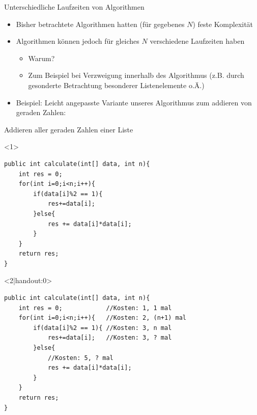 \begin{frame}{Unterschiedliche Laufzeiten von Algorithmen}
    \begin{itemize}[<+->]
        \item Bisher betrachtete Algorithmen hatten (für gegebenes $N$) feste Komplexität
        \item Algorithmen können jedoch für gleiches $N$ verschiedene Laufzeiten haben
        \begin{itemize}
            \item Warum?
            \item<+-|handout:0> Zum Beispiel bei Verzweigung innerhalb des Algorithmus (z.B. durch gesonderte Betrachtung besonderer Listenelemente o.Ä.)
        \end{itemize}
        \item Beispiel: Leicht angepasste Variante unseres Algorithmus zum addieren von geraden Zahlen:
    \end{itemize}
\end{frame}

\begin{frame}[fragile]{Addieren aller geraden Zahlen einer Liste}
\lstset{style=java}
\begin{onlyenv}<1>
\begin{lstlisting}
public int calculate(int[] data, int n){
    int res = 0;
    for(int i=0;i<n;i++){
        if(data[i]%2 == 1){
            res+=data[i];
        }else{
            res += data[i]*data[i];
        }
    }
    return res;
}
\end{lstlisting}
\end{onlyenv}
\begin{onlyenv}<2|handout:0>
\begin{lstlisting}
public int calculate(int[] data, int n){
    int res = 0;            //Kosten: 1, 1 mal
    for(int i=0;i<n;i++){   //Kosten: 2, (n+1) mal
        if(data[i]%2 == 1){ //Kosten: 3, n mal
            res+=data[i];   //Kosten: 3, ? mal
        }else{
            //Kosten: 5, ? mal
            res += data[i]*data[i];
        }
    }
    return res;
}
\end{lstlisting}
\end{onlyenv}
\end{frame}

